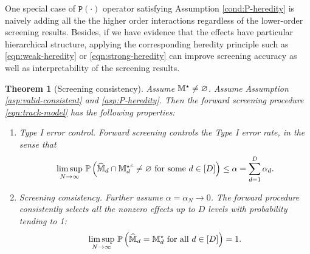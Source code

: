 \documentclass[12pt]{article}
\newtheorem{theorem}{Theorem}
\begin{document}
One special case of $\texttt{P}(\cdot)$ operator satisfying Assumption \ref{cond:P-heredity} is naively adding all the the higher order interactions regardless of the lower-order screening results. Besides, if we have evidence that the effects have particular hierarchical structure, applying the corresponding heredity principle such as \eqref{eqn:weak-heredity} or \eqref{eqn:strong-heredity} can improve screening accuracy as well as interpretability of the screening results.
\begin{theorem}[Screening consistency]\label{thm:ms-consistency}
Assume ${\mathbb{M}}^\star\neq\varnothing$. Assume Assumption \ref{asp:valid-consistent} and \ref{asp:P-heredity}.  Then the forward screening procedure \eqref{eqn:track-model} has the following properties:

\begin{enumerate}
    \item {\em Type I error control.} Forward screening controls the Type I error rate, in the sense that 
    \begin{align}
        \underset{N\to\infty}{\lim\sup}~{\mathbb{P}}\left(\widehat{{\mathbb{M}}}_d\cap{{\mathbb{M}}_d^\star}^c\neq\varnothing \text{ for some } d\in [D]\right)\le \alpha = \sum_{d=1}^D \alpha_d.
    \end{align}
    \item {\em  Screening consistency.} Further assume $\alpha=\alpha_N\to0$. The forward procedure consistently selects all the nonzero effects up to $D$ levels with probability tending to 1: 
    \begin{align}
        \underset{N \to \infty}{\lim\sup}~{\mathbb{P}}\left(\widehat{{\mathbb{M}}}_d = {\mathbb{M}}_d^\star \text{ for all }d\in[D]\right)=1.
    \end{align}
\end{enumerate}
\end{theorem}
\end{document}
